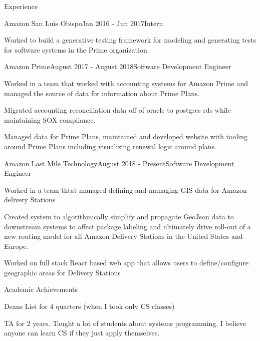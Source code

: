 \documentclass{resume} %
\begin{document}
\begin{rSection}{Experience}

\begin{rSubsection}{Amazon San Luis Obispo}{Jan 2016 - Jun 2017}{Intern}{}
\item Worked to build a generative testing framework for modeling and generating tests for software systems in the Prime organization. 
\end{rSubsection}


\begin{rSubsection}{Amazon Prime}{August 2017 - August 2018}{Software Development Engineer}{}
\item Worked in a team that worked with accounting systems for Amazon Prime and managed the source of data for information about Prime Plans.
\item Migrated accounting reconciliation data off of oracle to postgres rds while maintaining SOX compliance.
\item Managed data for Prime Plans, maintained and developed website with tooling around Prime Plans including visualizing renewal logic around plans. 
\end{rSubsection}


\begin{rSubsection}{Amazon Last Mile Technology}{August 2018 - Present}{Software Development Engineer}{}
\item Worked in a team thtat managed defining and managing GIS data for Amazon delivery Stations 
\item Created system to algorithmically simplify and propagate GeoJson data to downstream systems to affect package labeling and ultimately drive roll-out of a new routing model for all Amazon Delivery Stations in the United States and Europe.
\item Worked on full stack React based web app that allows users to define/configure geographic areas for Delivery Stations
\end{rSubsection}
\end{rSection}


\begin{rSection}{Academic Achievements} \itemsep -2pt
\item Deans List for 4 quarters (when I took only CS classes)
\item TA for 2 years. Taught a lot of students about systems programming, I believe anyone can learn CS if they just apply themselves.
\item 
\end{rSection}
\end{document}

